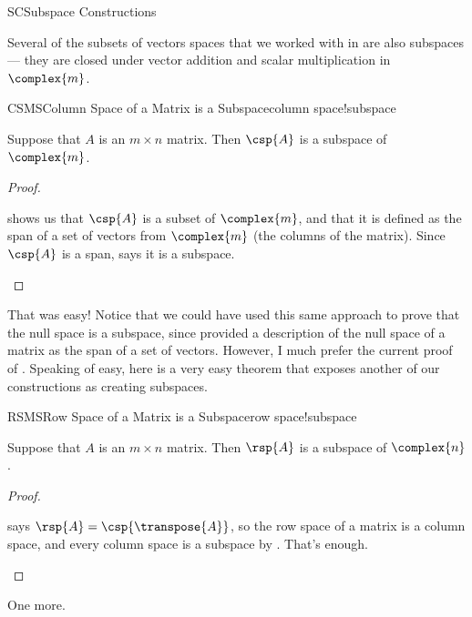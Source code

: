 \begin{subsect}{SC}{Subspace Constructions}
%
\begin{para}Several of the subsets of vectors spaces that we worked with in  are also subspaces --- they are closed under vector addition and scalar multiplication in $\complex{m}$.\end{para}
%
\begin{theorem}{CSMS}{Column Space of a Matrix is a Subspace}{column space!subspace}
\begin{para}Suppose that $A$ is an $m\times n$ matrix.  Then $\csp{A}$ is a subspace of $\complex{m}$.\end{para}
\end{theorem}
%
\begin{proof}
\begin{para} shows us that $\csp{A}$ is a subset of $\complex{m}$, and that it is defined as the span of a set of vectors from $\complex{m}$ (the columns of the matrix).  Since $\csp{A}$ is a span,  says it is a subspace.\end{para}
\end{proof}
%
\begin{para}That was easy!  Notice that we could have used this same approach to prove that the null space is a subspace, since  provided a description of the null space of a matrix as the span of a set of vectors.  However, I much prefer the current proof of .  Speaking of easy, here is a very easy theorem that exposes another of our constructions as creating subspaces.\end{para}
%
\begin{theorem}{RSMS}{Row Space of a Matrix is a Subspace}{row space!subspace}
\begin{para}Suppose that $A$ is an $m\times n$ matrix.  Then $\rsp{A}$ is a subspace of $\complex{n}$.\end{para}
\end{theorem}
%
\begin{proof}
\begin{para} says $\rsp{A}=\csp{\transpose{A}}$, so the row space of a matrix is a column space, and every column space is a subspace by .  That's enough.\end{para}
\end{proof}
%
\begin{para}One more.\end{para}

\end{subsect}
